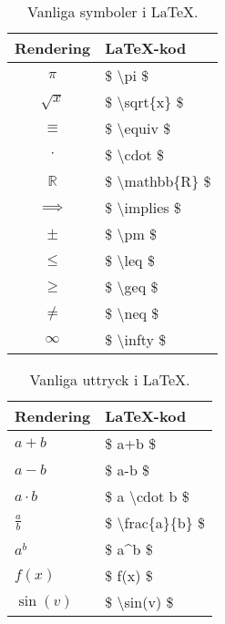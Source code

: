 \documentclass[titlepage]{article}
\begin{document}
\begin{table}[h]
    \begin{center}
        \begin{tabular}{| c | l |}
            \hline 
            \textbf{Rendering} & \textbf{\LaTeX-kod} \\
            \hline
            $\pi$ & \$ \textbackslash pi \$ \\
            \hline
            $\sqrt{ x }$ & \$ \textbackslash sqrt\{x\} \$ \\
            \hline
            $\equiv$ & \$ \textbackslash equiv \$ \\
            \hline
            $\cdot$ & \$ \textbackslash cdot \$ \\
            \hline
            $\mathbb{R}$ & \$ \textbackslash mathbb\{R\} \$ \\
            \hline
            $\implies$ & \$ \textbackslash implies \$ \\
            \hline
            $\pm$ & \$ \textbackslash pm \$ \\
            \hline
            $\leq$ & \$ \textbackslash leq \$ \\
            \hline
            $\geq$ & \$ \textbackslash geq \$ \\
            \hline
            $\neq$ & \$ \textbackslash neq \$ \\
            \hline
            $\infty$ & \$ \textbackslash infty \$ \\
            \hline
        \end{tabular}
        \caption{Vanliga symboler i \LaTeX.}
        \label{t1}
    \end{center}
\end{table}

\begin{table}[h]
    \begin{center}
        \begin{tabular}{| l | l |}
            \hline
            \textbf{Rendering} & \textbf{\LaTeX-kod} \\
            \hline
            $a+b$ & \$ a+b \$ \\
            \hline
            $a-b$ & \$ a-b \$ \\
            \hline
            $a \cdot b$ & \$ a \textbackslash cdot b \$ \\
            \hline
            $\frac{a}{b}$ & \$ \textbackslash frac\{a\}\{b\} \$ \\
            \hline
            $a^b$ & \$ a\textasciicircum b \$ \\
            \hline
            $f(x)$ & \$ f(x) \$ \\
            \hline
            $\sin(v)$ & \$ \textbackslash sin(v) \$ \\
            \hline
        \end{tabular}
        \caption{Vanliga uttryck i \LaTeX.}
        \label{t2}
    \end{center}
\end{table}
\end{document}
